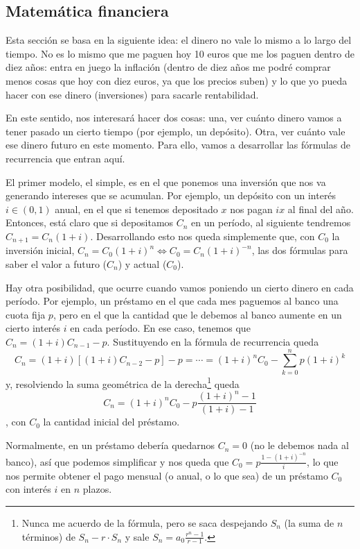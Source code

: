 \documentclass[nochap,palatino,shortheader]{apuntes}
\begin{document}
\subsection{Matemática financiera}

Esta sección se basa en la siguiente idea: el dinero no vale lo mismo a lo largo del tiempo. No es lo mismo que me paguen hoy 10 euros que me los paguen dentro de diez años: entra en juego la inflación (dentro de diez años me podré comprar menos cosas que hoy con diez euros, ya que los precios suben) y lo que yo pueda hacer con ese dinero (inversiones) para sacarle rentabilidad.

En este sentido, nos interesará hacer dos cosas: una, ver cuánto dinero vamos a tener pasado un cierto tiempo (por ejemplo, un depósito). Otra, ver cuánto vale ese dinero futuro en este momento. Para ello, vamos a desarrollar las fórmulas de recurrencia que entran aquí.

El primer modelo, el simple, es en el que ponemos una inversión que nos va generando intereses que se acumulan. Por ejemplo, un depósito con un interés $i ∈ (0,1)$ anual, en el que si tenemos depositado $x$ nos pagan $ix$ al final del año. Entonces, está claro que si depositamos $C_n$ en un período, al siguiente tendremos $C_{n+1} = C_n(1+i)$. Desarrollando esto nos queda simplemente que, con $C_0$ la inversión inicial, \( C_n = C_0 (1+i)^n \iff C_0 = C_n (1+i)^{-n} \label{eq:InteresCapFijo} \), las dos fórmulas para saber el valor a futuro ($C_n$) y actual ($C_0$).

Hay otra posibilidad, que ocurre cuando vamos poniendo un cierto dinero en cada período. Por ejemplo, un préstamo en el que cada mes paguemos al banco una cuota fija $p$, pero en el que la cantidad que le debemos al banco aumente en un cierto interés $i$ en cada período. En ese caso, tenemos que $C_n = (1 + i) C_{n-1} - p$. Sustituyendo en la fórmula de recurrencia queda \[ C_n = (1 + i) \left[ (1+i) C_{n-2} - p\right] - p = \dotsb = (1+i)^nC_0 - \sum_{k = 0}^{n} p (1 + i)^k \] y, resolviendo la suma geométrica de la derecha\footnote{Nunca me acuerdo de la fórmula, pero se saca despejando $S_n$ (la suma de $n$ términos) de $S_n - r·S_n$ y sale $S_n = a_0 \frac{r^n - 1}{r-1}$.} queda \[ C_n = (1+i)^nC_0 - p\frac{(1+i)^{n} - 1}{(1+i) - 1}  \], con $C_0$ la cantidad inicial del préstamo.

Normalmente, en un préstamo debería quedarnos $C_n = 0$ (no le debemos nada al banco), así que podemos simplificar y nos queda que \( C_0 = p \frac{1 - (1 + i)^{-n}}{i} \label{eq:InteresCapVariable}\), lo que nos permite obtener el pago mensual (o anual, o lo que sea) de un préstamo $C_0$ con interés $i$ en $n$ plazos.
\end{document}
